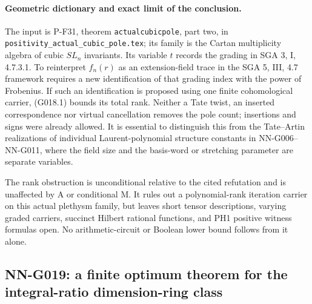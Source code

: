 \paragraph{Geometric dictionary and exact limit of the conclusion.}
The input is P-F31, theorem \texttt{actualcubicpole}, part two,
in \texttt{positivity\_actual\_cubic\_pole.tex}; its family is
the Cartan multiplicity algebra of cubic $SL_n$ invariants.
Its variable $t$ records the grading in SGA 3, I, 4.7.3.1.
To reinterpret $f_n(r)$ as an extension-field trace in the
SGA 5, III, 4.7 framework requires a new identification of
that grading index with the power of Frobenius. If such an
identification is proposed using one finite cohomological
carrier, (G018.1) bounds its total rank. Neither a Tate twist,
an inserted correspondence nor virtual cancellation removes
the pole count; insertions and signs were already allowed.
It is essential to distinguish this from the Tate--Artin
realizations of individual Laurent-polynomial structure
constants in NN-G006--NN-G011, where the field size and
the basis-word or stretching parameter are separate variables.

The rank obstruction is unconditional relative to the cited
refutation and is unaffected by A or conditional M. It
rules out a polynomial-rank iteration carrier on this actual
plethysm family, but leaves short tensor descriptions,
varying graded carriers, succinct Hilbert rational functions,
and PH1 positive witness formulas open. No arithmetic-circuit
or Boolean lower bound follows from it alone.

\subsection{NN-G019: a finite optimum theorem for the integral-ratio dimension-ring class}
